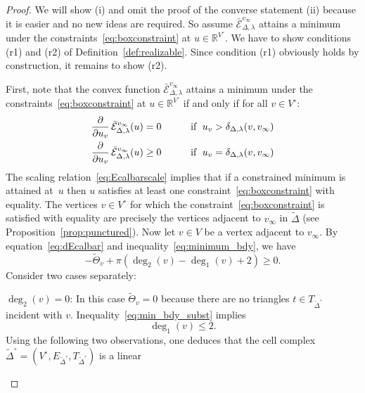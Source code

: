 \documentclass[a4paper, 11pt]{article}
\newcommand{\R}{\mathbb{R}}
\newcommand{\Deltil}{\widetilde{\Delta}}
\newcommand{\Deltilo}{\Deltil^{\circ}}
\newcommand{\Thetatil}{\widetilde{\Theta}}
\newcommand{\Ecal}{\mathcal{E}}
\newcommand{\Ecalbar}{\bar{\Ecal}}
\newcommand{\Vo}{V^{\circ}}
\theoremstyle{plain}
\theoremstyle{definition}
\begin{document}
\begin{proof}
  We will show (i) and omit the proof of the converse statement (ii)
  because it is easier and no new ideas are required. So assume
  $\Ecalbar^{v_{\infty}}_{\Delta,\lambda}$ attains a minimum under the
  constraints~\eqref{eq:boxconstraint} at $u\in \R^{\Vo}$. We have to
  show conditions (r1) and (r2) of
  Definition~\ref{def:realizable}. Since condition (r1) obviously
  holds by construction, it remains to show (r2).
 
  First, note that the convex function
  $\Ecalbar^{v_{\infty}}_{\Delta,\lambda}$ attains a minimum under the
  constraints~\eqref{eq:boxconstraint} at $u\in \R^{\Vo}$ if
  and only if for all $v\in\Vo$:
  \begin{alignat}{2}
    \label{eq:minimum_int}
    \frac{\partial}{\partial u_{v}}\,
    \Ecalbar^{v_{\infty}}_{\Delta,\lambda}(u) 
    &=0 
    &\qquad
    &\text{if\; }u_{v}>\delta_{\Delta,\lambda}(v,v_{\infty})\\
    \label{eq:minimum_bdy}
    \frac{\partial}{\partial u_{v}}\,
    \Ecalbar^{v_{\infty}}_{\Delta,\lambda}(u) 
    &\geq 0 
    &\qquad
    &\text{if\; }u_{v}=\delta_{\Delta,\lambda}(v,v_{\infty})
  \end{alignat}
  The scaling relation~\eqref{eq:Ecalbarscale} implies that if a
  constrained minimum is attained at~$u$ then $u$ satisfies at least
  one constraint~\eqref{eq:boxconstraint} with equality. The vertices
  $v\in\Vo$ for which the constraint~\eqref{eq:boxconstraint} is
  satisfied with equality are precisely the vertices
  adjacent to $v_{\infty}$ in $\Deltil$
  (see Proposition~\ref{prop:punctured}). Now let $v\in V$ be a vertex
  adjacent to $v_{\infty}$. By equation~\eqref{eq:dEcalbar} and
  inequality~\eqref{eq:minimum_bdy}, we have
  \begin{equation}
    \label{eq:min_bdy_subst}
    -\Thetatil_{v}+\pi(\deg_{2}(v)-\deg_{1}(v)+2)\geq 0.
  \end{equation}
  Consider two cases separately:
  \begin{compactenum}[(a)]
  \item $\deg_{2}(v)=0$: In this case $\Thetatil_{v}=0$ because there
    are no triangles $t\in T_{\Deltilo}$ incident with
    $v$. Inequality~\eqref{eq:min_bdy_subst} implies
    \begin{equation*}
      \deg_{1}(v)\leq 2.
    \end{equation*}
    Using the following two observations, one deduces that the cell
    complex $\Deltilo=(\Vo, E_{\Deltilo},T_{\Deltilo})$ is a linear

\end{compactenum}
\end{proof}
\end{document}
